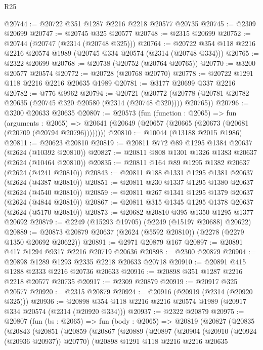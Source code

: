 \begin{lexlean}{R25}
\begin{coremodule}
@20744 := @20722 @351 @1287 @2216 @2218 @20577 @20735
@20745 := @2309 @20699
@20747 := @20745 @325 @20577
@20748 := @2315 @20699
@20752 := @20744 (@20747 (@2314 (@20748 @325)))
@20764 := @20722 @354 @118 @2216 @2216 @20574 @1989 (@20745 @334 @20574 (@2314 (@20748 @334)))
@20765 := @2322 @20699
@20768 := @20738 (@20752 (@20764 @20765))
@20770 := @3200 @20577 @20574
@20772 := @20728 (@20768 @20770)
@20778 := @20722 @1291 @118 @2216 @2216 @20635 @1989
@20781 := @3177 @20699 @337 @2216
@20782 := @776 @9962
@20794 := @20721
    (@20772 (@20778 (@20781 @20782 @20635 (@20745 @320 @20580 (@2314 (@20748 @320)))) @20765))
@20796 := @3200 @20633 @20635
@20807 := @20573
    (fun (function : @2065) =>
    fun (arguments : @2065) =>
    @20641 (@20649 (@20657 (@20665 (@20673 (@20681 (@20709 (@20794 @20796))))))))
@20810 := @10044 (@13188 @2015 @1986)
@20811 := @20623 @20810
@20819 := @20811 @772 @89 @1295 @1384 @20637 (@2624 (@10392 @20810))
@20827 := @20811 @808 @1301 @1326 @1383 @20637 (@2624 (@10464 @20810))
@20835 := @20811 @164 @89 @1295 @1382 @20637 (@2624 (@4241 @20810))
@20843 := @20811 @188 @1331 @1295 @1381 @20637 (@2624 (@4387 @20810))
@20851 := @20811 @230 @1337 @1295 @1380 @20637 (@2624 (@4540 @20810))
@20859 := @20811 @267 @1341 @1295 @1379 @20637 (@2624 (@4844 @20810))
@20867 := @20811 @315 @1345 @1295 @1378 @20637 (@2624 (@5170 @20810))
@20873 := @20682 @20810 @395 @1350 @1295 @1377 @20692
@20879 := @2249 (@15293 @19705) (@2249 (@15197 @20688) @20622)
@20889 := @20873 @20879 @20637 (@2624 (@5592 @20810)) (@2278 (@2279 @1350 @20692 @20622))
@20891 := @2971 @20879 @167
@20897 := @20891 @417 @1294 @9317 @2216 @20719 @20636
@20898 := @2300 @20879
@20904 := @20898 @1289 @1293 @2335 @2218 @20633 @20718
@20910 := @20891 @415 @1288 @2333 @2216 @20736 @20633
@20916 := @20898 @351 @1287 @2216 @2218 @20577 @20735
@20917 := @2309 @20879
@20919 := @20917 @325 @20577
@20920 := @2315 @20879
@20924 := @20916 (@20919 (@2314 (@20920 @325)))
@20936 := @20898 @354 @118 @2216 @2216 @20574 @1989 (@20917 @334 @20574 (@2314 (@20920 @334)))
@20937 := @2322 @20879
@20975 := @20807
    (fun (bs : @2065) =>
    fun (body : @2065) =>
    @20819
      (@20827
        (@20835
          (@20843
            (@20851
              (@20859
                (@20867
                  (@20889
                    (@20897
                      (@20904
                        (@20910 (@20924 (@20936 @20937)) @20770)
                        (@20898
                          @1291
                          @118
                          @2216
                          @2216
                          @20635

\end{coremodule}
\end{lexlean}
